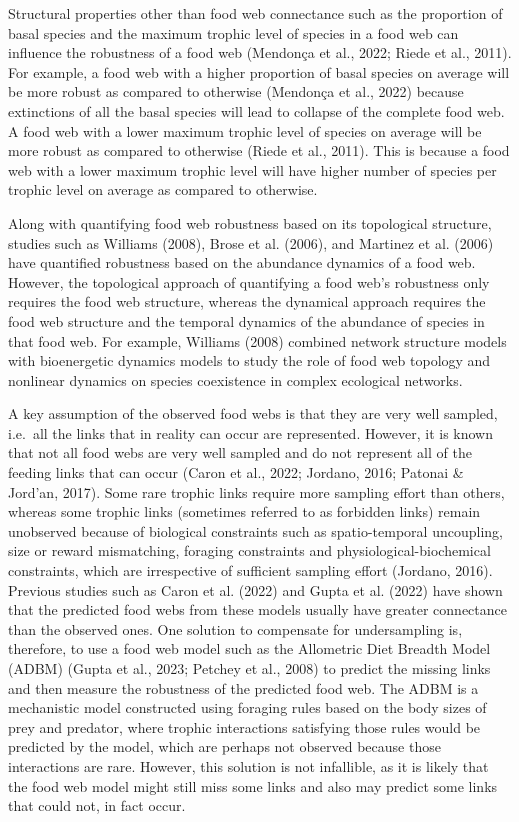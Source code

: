 \documentclass{article}
\begin{document}
Structural properties other than food web connectance such as the
proportion of basal species and the maximum trophic level of species in
a food web can influence the robustness of a food web (Mendonça et al.,
2022; Riede et al., 2011). For example, a food web with a higher
proportion of basal species on average will be more robust as compared
to otherwise (Mendonça et al., 2022) because extinctions of all the
basal species will lead to collapse of the complete food web. A food web
with a lower maximum trophic level of species on average will be more
robust as compared to otherwise (Riede et al., 2011). This is because a
food web with a lower maximum trophic level will have higher number of
species per trophic level on average as compared to otherwise.

Along with quantifying food web robustness based on its topological
structure, studies such as Williams (2008), Brose et al. (2006), and
Martinez et al. (2006) have quantified robustness based on the abundance
dynamics of a food web. However, the topological approach of quantifying
a food web's robustness only requires the food web structure, whereas
the dynamical approach requires the food web structure and the temporal
dynamics of the abundance of species in that food web. For example,
Williams (2008) combined network structure models with bioenergetic
dynamics models to study the role of food web topology and nonlinear
dynamics on species coexistence in complex ecological networks.

A key assumption of the observed food webs is that they are very well
sampled, i.e.~all the links that in reality can occur are represented.
However, it is known that not all food webs are very well sampled and do
not represent all of the feeding links that can occur (Caron et al.,
2022; Jordano, 2016; Patonai \& Jord'an, 2017). Some rare trophic links
require more sampling effort than others, whereas some trophic links
(sometimes referred to as forbidden links) remain unobserved because of
biological constraints such as spatio-temporal uncoupling, size or
reward mismatching, foraging constraints and physiological-biochemical
constraints, which are irrespective of sufficient sampling effort
(Jordano, 2016). Previous studies such as Caron et al. (2022) and Gupta
et al. (2022) have shown that the predicted food webs from these models
usually have greater connectance than the observed ones. One solution to
compensate for undersampling is, therefore, to use a food web model such
as the Allometric Diet Breadth Model (ADBM) (Gupta et al., 2023; Petchey
et al., 2008) to predict the missing links and then measure the
robustness of the predicted food web. The ADBM is a mechanistic model
constructed using foraging rules based on the body sizes of prey and
predator, where trophic interactions satisfying those rules would be
predicted by the model, which are perhaps not observed because those
interactions are rare. However, this solution is not infallible, as it
is likely that the food web model might still miss some links and also
may predict some links that could not, in fact occur.
\end{document}
